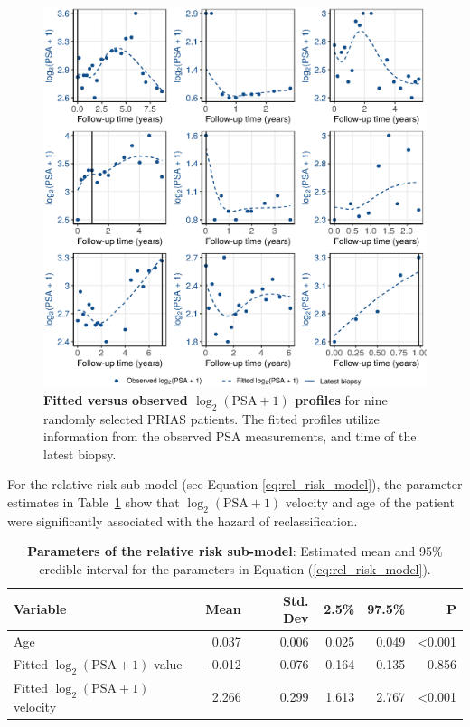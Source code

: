 \begin{figure}
\centerline{\includegraphics[width=\columnwidth]{images/fitted_9subject_psa.eps}}
\caption{\textbf{Fitted versus observed ${\log_2 (\mbox{PSA} + 1)}$ profiles} for nine randomly selected PRIAS patients. The fitted profiles utilize information from the observed PSA measurements, and time of the latest biopsy.}
\label{fig:fitted_9subject_psa}
\end{figure}

For the relative risk sub-model (see Equation \ref{eq:rel_risk_model}), the parameter estimates in Table~\ref{tab:PSA_survival} show that ${\log_2 (\mbox{PSA} + 1)}$ velocity and age of the patient were significantly associated with the hazard of reclassification.

\begin{table}
\small\sf\centering
\caption{\textbf{Parameters of the relative risk sub-model}: Estimated mean and 95\% credible interval for the parameters in Equation (\ref{eq:rel_risk_model}).}
\label{tab:PSA_survival}
\begin{tabular}{lrrrrr}
\hline
Variable                      & Mean   & Std. Dev & 2.5\%  & 97.5\%                 & P              \\
\hline
Age                      & 0.037    & 0.006 & 0.025  & 0.049  & \textless0.001 \\
Fitted $\log_2 (\mbox{PSA} + 1)$ value            & -0.012   & 0.076 & -0.164 & 0.135  & 0.856 \\
Fitted $\log_2 (\mbox{PSA} + 1)$ velocity             & 2.266    & 0.299 & 1.613  & 2.767  & \textless0.001   \\
\hline
\end{tabular}
\end{table}

